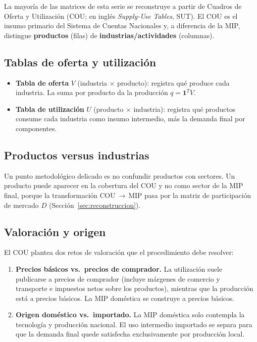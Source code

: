 \documentclass[11pt,a4paper]{article}
\begin{document}
La mayoría de las matrices de esta serie se reconstruye a partir de Cuadros de
Oferta y Utilización (COU; en inglés \emph{Supply-Use Tables}, SUT). El COU es el
insumo primario del Sistema de Cuentas Nacionales y, a diferencia de la MIP,
distingue \textbf{productos} (filas) de \textbf{industrias/actividades}
(columnas).

\subsection{Tablas de oferta y utilización}
\begin{itemize}[leftmargin=1.6em]
  \item \textbf{Tabla de oferta} $V$ (industria $\times$ producto): registra qué
        produce cada industria. La suma por producto da la producción
        $q=\mathbf{1}^{T}V$.
  \item \textbf{Tabla de utilización} $U$ (producto $\times$ industria): registra
        qué productos consume cada industria como insumo intermedio, más la
        demanda final por componentes.
\end{itemize}

\subsection{Productos versus industrias}
Un punto metodológico delicado es no confundir productos con sectores. Un
producto puede aparecer en la cobertura del COU y no como sector de la MIP final,
porque la transformación COU$\,\to\,$MIP pasa por la matriz de participación de
mercado $D$ (Sección~\ref{sec:reconstruccion}).

\subsection{Valoración y origen}
El COU plantea dos retos de valoración que el procedimiento debe resolver:
\begin{enumerate}[leftmargin=1.6em]
  \item \textbf{Precios básicos vs.\ precios de comprador.} La utilización suele
        publicarse a precios de comprador (incluye márgenes de comercio y
        transporte e impuestos netos sobre los productos), mientras que la
        producción está a precios básicos. La MIP doméstica se construye a
        precios básicos.
  \item \textbf{Origen doméstico vs.\ importado.} La MIP doméstica solo contempla
        la tecnología y producción nacional. El uso intermedio importado se
        separa para que la demanda final quede satisfecha exclusivamente por
        producción local.
\end{enumerate}
\end{document}
